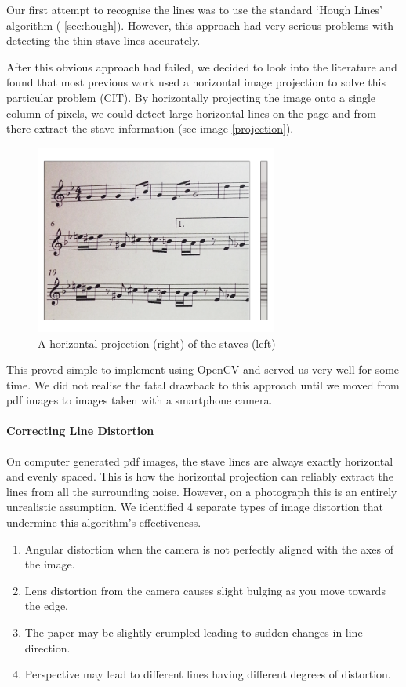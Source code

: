 Our first attempt to recognise the lines was to use the standard ‘Hough Lines’ algorithm ( \autoref{sec:hough}). However, this approach had very serious problems with detecting the thin stave lines accurately.

After this obvious approach had failed, we decided to look into the literature and found that most previous work used a horizontal image projection to solve this particular problem (CIT). By horizontally projecting the image onto a single column of pixels, we could detect large horizontal lines on the page and from there extract the stave information (see image \ref{projection}).

\begin{figure}[h!]
    \centering
    \includegraphics[width=80mm]{./assets/projection.png}
    \caption{A horizontal projection (right) of the staves (left)}
    \label{image:projection}
\end{figure}

This proved simple to implement using OpenCV and served us very well for some time. We did not realise the fatal drawback to this approach until we moved from pdf images to images taken with a smartphone camera. 

\paragraph{Correcting Line Distortion}

On computer generated pdf images, the stave lines are always exactly horizontal and evenly spaced. This is how the horizontal projection can reliably extract the lines from all the surrounding noise. However, on a photograph this is an entirely unrealistic assumption. We identified 4 separate types of image distortion that undermine this algorithm’s effectiveness.

\begin{enumerate}
\item{Angular distortion when the camera is not perfectly aligned with the axes of the image.}
\item{Lens distortion from the camera causes slight bulging as you move towards the edge.}
\item{The paper may be slightly crumpled leading to sudden changes in line direction.}
\item{Perspective may lead to different lines having different degrees of distortion.}
\end{enumerate}

